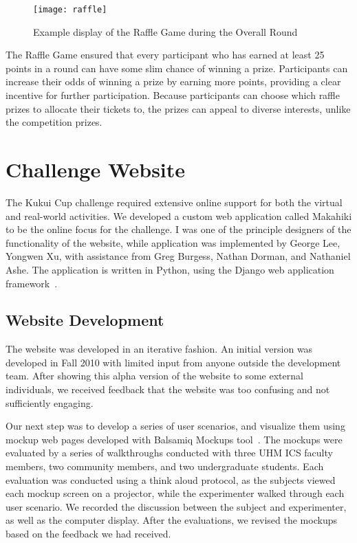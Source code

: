 \begin{figure}[htbp]
	\centering
		\texttt{[image: raffle]}
		\caption{Example display of the Raffle Game during the Overall Round}
\label{fig:raffle-game}
\end{figure}

The Raffle Game ensured that every participant who has earned at least 25 points in a round can have some slim chance of winning a prize. Participants can increase their odds of winning a prize by earning more points, providing a clear incentive for further participation. Because participants can choose which raffle prizes to allocate their tickets to, the prizes can appeal to diverse interests, unlike the competition prizes.

\section{Challenge Website}
\label{sec:challenge-website}

The Kukui Cup challenge required extensive online support for both the virtual and real-world activities. We developed a custom web application called Makahiki to be the online focus for the challenge. I was one of the principle designers of the functionality of the website, while application was implemented by George Lee, Yongwen Xu, with assistance from Greg Burgess, Nathan Dorman, and Nathaniel Ashe. The application is written in Python, using the Django web application framework~\cite{django-website}.

\subsection{Website Development}

The website was developed in an iterative fashion. An initial version was developed in Fall 2010 with limited input from anyone outside the development team. After showing this alpha version of the website to some external individuals, we received feedback that the website was too confusing and not sufficiently engaging.

Our next step was to develop a series of user scenarios, and visualize them using mockup web pages developed with Balsamiq Mockups tool~\cite{balsamiq-website}. The mockups were evaluated by a series of walkthroughs conducted with three UHM ICS faculty members, two community members, and two undergraduate students. Each evaluation was conducted using a think aloud protocol, as the subjects viewed each mockup screen on a projector, while the experimenter walked through each user scenario. We recorded the discussion between the subject and experimenter, as well as the computer display. After the evaluations, we revised the mockups based on the feedback we had received.


